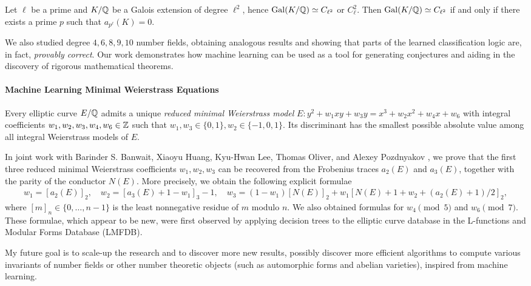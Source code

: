 \documentclass[letterpaper, 10pt]{article}
\begin{document}
\begin{theorem*}[Lee--L.]
\label{thm:ellsqzeta}
    Let $\ell$ be a prime and $K / \mathbb{Q}$ be a Galois extension of degree $\ell^2$, hence $\mathrm{Gal}(K/\mathbb{Q}) \simeq C_{\ell^2}$ or $C_{\ell}^2$.
    Then $\mathrm{Gal}(K / \mathbb{Q}) \simeq C_{\ell^2}$ if and only if there exists a prime $p$ such that $a_{p^\ell}(K) = 0$.
\end{theorem*}

We also studied degree \(4, 6, 8, 9, 10\) number fields, obtaining analogous results and showing that parts of the learned classification logic are, in fact, \emph{provably correct}.
Our work demonstrates how machine learning can be used as a tool for generating conjectures and aiding in the discovery of rigorous mathematical theorems.


\paragraph{Machine Learning Minimal Weierstrass Equations}

Every elliptic curve $E/\mathbb{Q}$ admits a unique \emph{reduced minimal Weierstrass model} $E\colon y^2+w_1xy+w_3y=x^3+w_2x^2+w_4x+w_6$ with integral coefficients $w_1, w_2, w_3, w_4, w_6 \in \mathbb{Z}$ such that $w_1,w_3\in\{0,1\}, w_2\in\{-1,0,1\}$.
Its discriminant has the smallest possible absolute value among all integral Weierstrass models of $E$.

In joint work with Barinder S. Banwait, Xiaoyu Huang, Kyu-Hwan Lee, Thomas Oliver, and Alexey Pozdnyakov \cite{bhllop2026weierstrass}, we prove that the first three reduced minimal Weierstrass coefficients $w_1,w_2,w_3$ can be recovered from the Frobenius traces $a_2(E)$ and $a_3(E)$, together with the parity of the conductor $N(E)$.
More precisely, we obtain the following explicit formulae
\begin{align*}
w_1=[a_2(E)]_2,\quad w_2=[a_3(E)+1-w_1]_3-1, \quad
w_3 = (1 - w_1) [N(E)]_2 + w_1 \left[ N(E) + 1 + w_2 + (a_2(E) + 1)/2 \right]_2,
\end{align*}
where $[m]_n \in \{0, \dots, n-1\}$ is the least nonnegative residue of $m$ modulo $n$.
We also obtained formulas for $w_4 \pmod{5}$ and $w_6 \pmod{7}$.
These formulae, which appear to be new, were first observed by applying decision trees to the elliptic curve database in the L-functions and Modular Forms Database (LMFDB).

My future goal is to scale-up the research and to discover more new results, possibly discover more efficient algorithms to compute various invariants of number fields or other number theoretic objects (such as automorphic forms and abelian varieties), inspired from machine learning.
\end{document}
